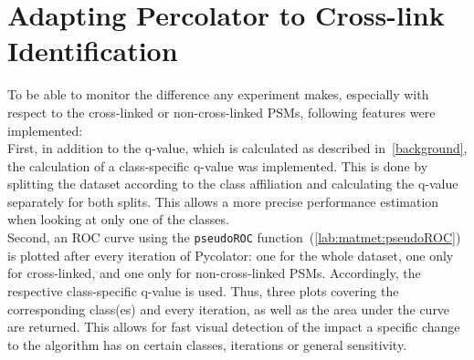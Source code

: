 \section{Adapting Percolator to Cross-link Identification}
To be able to monitor the difference any experiment makes, especially with respect to the cross-linked or non-cross-linked PSMs, following features were implemented:\\
First, in addition to the q-value, which is calculated as described in~\ref{background}, the calculation of a class-specific q-value was implemented. This is done by splitting the dataset according to the class affiliation and calculating the q-value separately for both splits. This allows a more precise performance estimation when looking at only one of the classes.\\
\label{lab:matmet:rocs_after_every_iteration}
Second, an ROC curve using the \texttt{pseudoROC} function~(\ref{lab:matmet:pseudoROC}) is plotted after every iteration of Pycolator: one for the whole dataset, one only for cross-linked, and one only for non-cross-linked PSMs. Accordingly, the respective class-specific q-value is used. Thus, three plots covering the corresponding class(es) and every iteration, as well as the area under the curve are returned. This allows for fast visual detection of the impact a specific change to the algorithm has on certain classes, iterations or general sensitivity.

